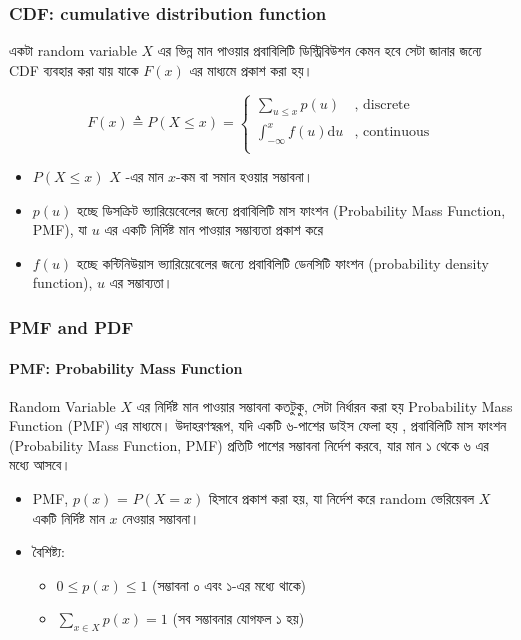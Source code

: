 \documentclass[graybox, envcountchap, twocolumn]{styles/svmult}
\begin{document}
\subsubsection{CDF: cumulative distribution function}
{\bengalifont একটা random variable} $X$ {\bengalifont এর ভিন্ন মান পাওয়ার প্রবাবিলিটি ডিস্ট্রিবিউশন কেমন হবে সেটা জানার জন্যে CDF ব্যবহার করা যায় যাকে} $ 𝐹(𝑥) $ {\bengalifont এর মাধ্যমে প্রকাশ করা হয়। }

\begin{equation}
F(x) \triangleq P(X \leq x)=\begin{cases}
\sum_{u \leq x}p(u) & \text{, discrete}\\
\int_{-\infty}^{x} f(u)\mathrm{d}u & \text{, continuous}\\
\end{cases}
\end{equation}
\bengalifont
\begin{itemize}
    \item $  P(X \leq x) $ $X$ -{\bengalifont এর মান} $x$-{ কম বা সমান হওয়ার সম্ভাবনা।}
    \item $p(u)$ {\bengalifont হচ্ছে ডিসক্রিট ভ্যারিয়েবেলের জন্যে  প্রবাবিলিটি মাস ফাংশন (Probability Mass Function, PMF), যা $u$ এর একটি নির্দিষ্ট মান পাওয়ার সম্ভাব্যতা প্রকাশ করে }
    \item $ f(u)$ {\bengalifont হচ্ছে কন্টিনিউয়াস ভ্যারিয়েবেলের জন্যে প্রবাবিলিটি ডেনসিটি ফাংশন (probability density function), $u$ এর সম্ভাব্যতা। } 
\end{itemize}



\subsubsection{PMF and PDF}
\paragraph{PMF: Probability Mass Function}
{\bengalifont
Random Variable $X$ এর নির্দিষ্ট মান পাওয়ার সম্ভাবনা কতটুকু, সেটা নির্ধারন করা হয় Probability Mass Function (PMF) এর মাধ্যমে। উদাহরণস্বরূপ,  যদি একটি ৬-পাশের ডাইস ফেলা হয় , প্রবাবিলিটি মাস ফাংশন (Probability Mass Function, PMF) প্রতিটি পাশের সম্ভাবনা নির্দেশ করবে, যার মান ১ থেকে ৬ এর মধ্যে আসবে।
}
\begin{itemize}
    \item PMF,  $p(x)$ = $P(X=x)$ {\bengalifont হিসাবে প্রকাশ করা হয়, যা নির্দেশ করে random ভেরিয়েবল} $X$ {\bengalifont একটি নির্দিষ্ট মান } $x$ {\bengalifont নেওয়ার সম্ভাবনা। }
    \item {\bengalifont বৈশিষ্ট্য:}
    \begin{itemize}
        \item $0 ≤ p(x) ≤ 1$ {\bengalifont (সম্ভাবনা ০ এবং ১-এর মধ্যে থাকে)}
        \item $\sum_{x \in X} p(x) = 1$ {\bengalifont (সব সম্ভাবনার যোগফল ১ হয়)}
    \end{itemize}
\end{itemize}
\end{document}
